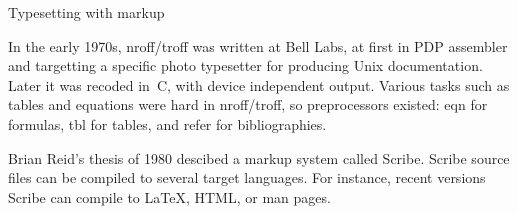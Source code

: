  {Typesetting with markup}

In the early 1970s, nroff/troff was written at Bell Labs, at first in
PDP assembler and targetting a specific photo typesetter for producing
Unix documentation. Later it was recoded in~C, with device independent
output. Various tasks such as tables and equations were hard in
nroff/troff, so preprocessors existed: eqn for formulas, tbl for
tables, and refer for bibliographies.

Brian Reid's thesis of 1980 descibed a markup system called
Scribe. Scribe source files can be compiled to several target
languages. For instance, recent versions Scribe can compile to \LaTeX,
HTML, or man pages.

\endinput
\Level 0 {Document typesetting systems}

Scribe, troff, Lout, \TeX.

